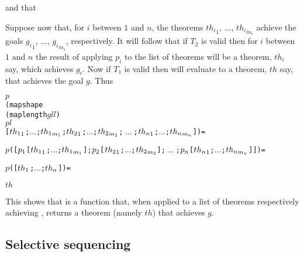 \bigskip


\bigskip

\noindent and that

\bigskip


\bigskip

Suppose now that, for $i$ between $1$ and $n$, the theorems
${th_i}_1$, $\dots$, ${th_i}_{m_i}$ achieve
the goals ${g_i}_1$, $\dots$, ${g_i}_{m_i}$, respectively.
It will follow that if $T_2$ is valid
then for $i$ between $1$ and $n$
the result of applying $p_i$ to the list of
theorems \ml{[${th_i}_1$;$\ldots$;${th_i}_{m_i}$]}
will be a theorem, $th_i$ say, which achieves
$g_i$.
Now if $T_1$ is valid then 
will evaluate to a theorem,
$th$ say,
that achieves the goal $g$. Thus

\begin{hol}\begin{alltt}
    \(p\)
    (mapshape
     (map length \(gll\))
     \(pl\)
     [\({th\sb{1}}\sb{1}\);\(\ldots\);\({th\sb{1}}\sb{m\sb{1}}\);\({th\sb{2}}\sb{1}\);\(\ldots\);\({th\sb{2}}\sb{m\sb{2}}\);\(\ \ldots\ \) ;\({th\sb{n}}\sb{1}\);\(\ldots\);\({th\sb{n}}\sb{m\sb{n}}\)]) =

    \(p\)([\(p\sb{1}\)[\({th\sb{1}}\sb{1}\);\(\ldots\);\({th\sb{1}}\sb{m\sb{1}}\)];\(p\sb{2}\)[\({th\sb{2}}\sb{1}\);\(\ldots\);\({th\sb{2}}\sb{m\sb{2}}\)];\(\ \ldots\ \);\(p\sb{n}\)[\({th\sb{n}}\sb{1}\);\(\ldots\);\({th\sb{n}}\sb{m\sb{n}}\)]]) =

    \(p\)([\(th\sb{1}\);\(\ldots\);\(th\sb{n}\)]) =

    \(th\)
\end{alltt}\end{hol}

This shows that
is a function that, when
applied to a list of theorems respectively
achieving , returns a theorem
(namely $th$) that achieves $g$.

\subsection{Selective sequencing}

